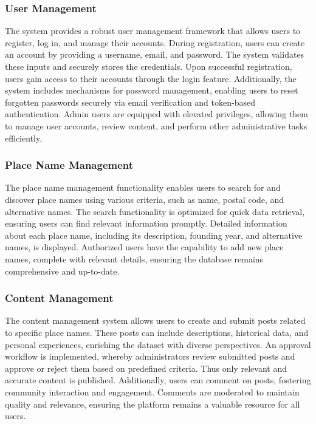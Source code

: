 \subsubsection{User Management}
The system provides a robust user management framework that allows users to register, log in, and manage their accounts. During registration, users can create an account by providing a username, email, and password. The system validates these inputs and securely stores the credentials. Upon successful registration, users gain access to their accounts through the login feature. Additionally, the system includes mechanisms for password management, enabling users to reset forgotten passwords securely via email verification and token-based authentication. Admin users are equipped with elevated privileges, allowing them to manage user accounts, review content, and perform other administrative tasks efficiently.

\subsubsection{Place Name Management}
The place name management functionality enables users to search for and discover place names using various criteria, such as name, postal code, and alternative names. The search functionality is optimized for quick data retrieval, ensuring users can find relevant information promptly. Detailed information about each place name, including its description, founding year, and alternative names, is displayed. Authorized users have the capability to add new place names, complete with relevant details, ensuring the database remains comprehensive and up-to-date.

\subsubsection{Content Management}
The content management system allows users to create and submit posts related to specific place names. These posts can include descriptions, historical data, and personal experiences, enriching the dataset with diverse perspectives. An approval workflow is implemented, whereby administrators review submitted posts and approve or reject them based on predefined criteria. Thus only relevant and accurate content is published. Additionally, users can comment on posts, fostering community interaction and engagement. Comments are moderated to maintain quality and relevance, ensuring the platform remains a valuable resource for all users.

